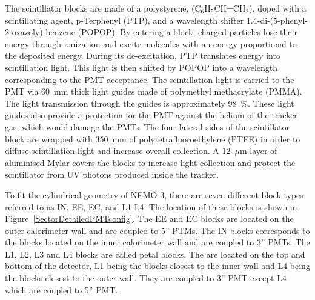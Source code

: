 \documentclass[main.tex]{subfiles}
\begin{document}
\NI The scintillator blocks are made of a polystyrene, (C$_\text{6}$H$_\text{5}$CH=CH$_\text{2}$), doped with a scintillating agent, p-Terphenyl (PTP), and a wavelength shifter 1.4-di-(5-phenyl-2-oxazoly) benzene (POPOP). By entering a block, charged particles lose their energy through ionization and excite molecules with an energy proportional to the deposited energy. During its de-excitation, PTP translates energy into scintillation light. This light is then shifted by POPOP into a wavelength corresponding to the PMT acceptance. The scintillation light is carried to the PMT via 60~mm thick light guides made of polymethyl methacrylate (PMMA). The light transmission through the guides is approximately 98~\%. These light guides also provide a protection for the PMT against the helium of the tracker gas, which would damage the PMTs. The four lateral sides of the scintillator block are wrapped with 350~mm of polytetrafluoroethylene (PTFE) in order to diffuse scintillation light and increase overall collection. A 12~$\mu$m layer of aluminised Mylar covers the blocks to increase light collection and protect the scintillator from UV photons produced inside the tracker.


\bigskip




\bigskip


\NI To fit the cylindrical geometry of NEMO-3, there are seven different block types referred to as IN, EE, EC, and L1-L4. The location of these blocks is shown in Figure~\ref{SectorDetailedPMTconfig}. The EE and EC blocks are located on the outer calorimeter wall and are coupled to 5'' PTMs. The IN blocks corresponds to the blocks located on the inner calorimeter wall and are coupled to 3'' PMTs. The L1, L2, L3 and L4 blocks are called petal blocks. The are located on the top and bottom of the detector, L1 being the blocks closest to the inner wall and L4 being the blocks closest to the outer wall. They are coupled to 3'' PMT except L4 which are coupled to 5'' PMT.  
\end{document}
